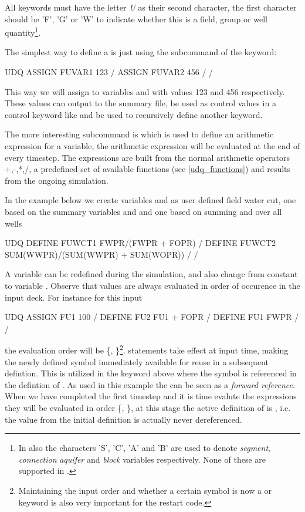 All \udq{} keywords must have the letter \emph{U} as their second character, the
first character should be 'F', 'G' or 'W' to indicate whether this is a field,
group or well quantity\footnote{In \eclipse{} also the characters 'S', 'C', 'A'
and 'B' are used to denote \emph{segment}, \emph{connection}  \emph{aquifer} and
\emph{block} variables respectively. None of these are supported in \flow{}.}.

The simplest way to define a \udq{} is just using the  subcommand of
the \udq{} keyword:
\begin{deck}
UDQ
  ASSIGN FUVAR1 123 /
  ASSIGN FUVAR2 456 /
/
\end{deck}
This way we will assign to variables  and 
with values 123 and 456 respectively. These values can output to the summary
file, be used as control values in a control keyword like  and be
used to recursively define another \udq{} keyword.

The more interesting \udq{} subcommand is  which is used to define an
arithmetic expression for a \udq{} variable, the arithmetic expression will be
evaluated at the end of every timestep. The expressions are built from the
normal arithmetic operators +,-,*,/, a predefined set of available functions
(see \ref{udq_functions}) and results from the ongoing simulation.

In the example below we create \udq{} variables  and  as
user defined field water cut, one based on the summary variables  and
 and one based on summing  and  over all wells
\begin{deck}
UDQ
  DEFINE FUWCT1 FWPR/(FWPR + FOPR) /
  DEFINE FUWCT2 SUM(WWPR)/(SUM(WWPR) + SUM(WOPR)) /
/
\end{deck}

A \udq{} variable can be redefined during the simulation, and also change from
constant  to variable . Observe that \udq{} values are
always evaluated in order of occurence in the input deck. For instance for this
input
\begin{deck}
UDQ
  ASSIGN FU1 100 /
  DEFINE FU2 FU1 + FOPR /
  DEFINE FU1 FWPR /
/
\end{deck}
the evaluation order will be \{, \}\footnote{Maintaining the
input order and whether a certain \udq{} symbol is now a  or
 keyword is also very important for the restart code.}. 
statements take effect at input time, making the newly defined symbol
immediately available for reuse in a subsequent defintion. This is utilized in
the \udq{} keyword above where the symbol  is referenced in the
defintion of . As used in this example the  can be
seen as a \emph{forward reference}. When we have completed the first timestep
and it is time evalute the \udq{} expressions they will be evaluated in order
\{, \}, at this stage the active definition of  is
, i.e. the value  from the initial
definition  is actually never dereferenced.

